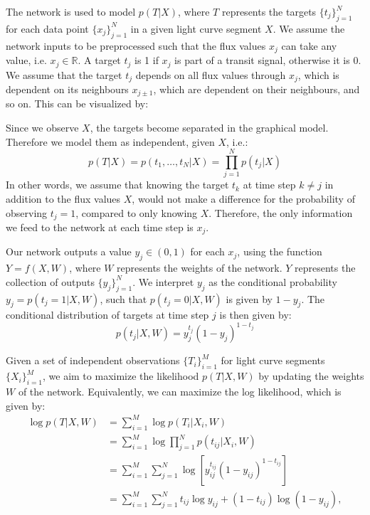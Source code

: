 
The network is used to model $p(T|X)$, where $T$ represents the targets $\{t_j\}_{j=1}^N$ for each data point $\{x_j\}_{j=1}^N$ in a given light curve segment $X$. We assume the network inputs to be preprocessed such that the flux values $x_j$ can take any value, i.e. $x_j \in \mathbb{R}$. A target $t_j$ is 1 if $x_j$ is part of a transit signal, otherwise it is 0. We assume that the target $t_j$ depends on all flux values through $x_j$, which is dependent on its neighbours $x_{j\pm1}$, which are dependent on their neighbours, and so on. This can be visualized by:

\begin{figure}[H]
\centering
\end{figure}
\noindent Since we observe $X$, the targets become separated in the graphical model. Therefore we model them as independent, given $X$, i.e.:
\begin{equation}
    p(T|X) = p(t_1,\dots,t_N|X) = \prod_{j=1}^N p(t_j|X)
\end{equation}
In other words, we assume that knowing the target $t_{k}$ at time step $k \neq j$ in addition to the flux values $X$, would not make a difference for the probability of observing $t_j = 1$, compared to only knowing $X$. Therefore, the only information we feed to the network at each time step is $x_j$.

Our network outputs a value $y_j \in (0,1)$ for each $x_j$, using the function $Y = f(X, W)$, where $W$ represents the weights of the network. $Y$ represents the collection of outputs $\{y_j\}_{j=1}^N$. We interpret $y_j$ as the conditional probability $y_j = p(t_j=1|X,W)$, such that $p(t_j=0|X,W)$ is given by $1-y_j$. The conditional distribution of targets at time step $j$ is then given by:
\begin{equation}
    p(t_j|X,W) = y_j^{t_j} (1-y_j)^{1-t_j}
\end{equation}

\noindent Given a set of independent observations $\{T_i\}_{i=1}^M$ for light curve segments $\{X_i\}_{i=1}^M$, we aim to maximize the likelihood $p(T|X,W)$ by updating the weights $W$ of the network. Equivalently, we can maximize the log likelihood, which is given by:
\begin{align}
    \log p(T|X,W) &= \sum_{i=1}^M \log  p(T_i|X_i,W) \\
    &= \sum_{i=1}^M \log \prod_{j=1}^N p(t_{ij}|X_i,W) \\
    &= \sum_{i=1}^M \sum_{j=1}^N \log [ y_{ij}^{t_{ij}} (1-y_{ij})^{1-t_{ij}} ] \\
    &= \sum_{i=1}^M \sum_{j=1}^N t_{ij} \log y_{ij} + (1-t_{ij}) \log(1-y_{ij}),
\end{align}

